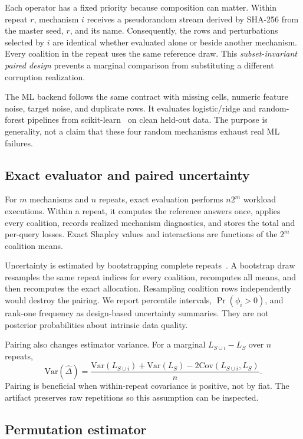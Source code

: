 \documentclass[conference]{IEEEtran}
\begin{document}
Each operator has a fixed priority because composition can matter. Within repeat $r$, mechanism $i$ receives a pseudorandom stream derived by SHA-256 from the master seed, $r$, and its name. Consequently, the rows and perturbations selected by $i$ are identical whether evaluated alone or beside another mechanism. Every coalition in the repeat uses the same reference draw. This \emph{subset-invariant paired design} prevents a marginal comparison from substituting a different corruption realization.

The ML backend follows the same contract with missing cells, numeric feature noise, target noise, and duplicate rows. It evaluates logistic/ridge and random-forest pipelines from scikit-learn~\cite{pedregosa2011sklearn} on clean held-out data. The purpose is generality, not a claim that these four random mechanisms exhaust real ML failures.

\subsection{Exact evaluator and paired uncertainty}

For $m$ mechanisms and $n$ repeats, exact evaluation performs $n2^m$ workload executions. Within a repeat, it computes the reference answers once, applies every coalition, records realized mechanism diagnostics, and stores the total and per-query losses. Exact Shapley values and interactions are functions of the $2^m$ coalition means.

Uncertainty is estimated by bootstrapping complete repeats~\cite{efron1993bootstrap}. A bootstrap draw resamples the same repeat indices for every coalition, recomputes all means, and then recomputes the exact allocation. Resampling coalition rows independently would destroy the pairing. We report percentile intervals, $\Pr(\phi_i>0)$, and rank-one frequency as design-based uncertainty summaries. They are not posterior probabilities about intrinsic data quality.

Pairing also changes estimator variance. For a marginal $L_{S\cup i}-L_S$ over $n$ repeats,
\begin{equation}
 \mathrm{Var}(\widehat\Delta)=\frac{\mathrm{Var}(L_{S\cup i})+\mathrm{Var}(L_S)-2\mathrm{Cov}(L_{S\cup i},L_S)}{n}.
\end{equation}
Pairing is beneficial when within-repeat covariance is positive, not by fiat. The artifact preserves raw repetitions so this assumption can be inspected.

\subsection{Permutation estimator}
\end{document}
